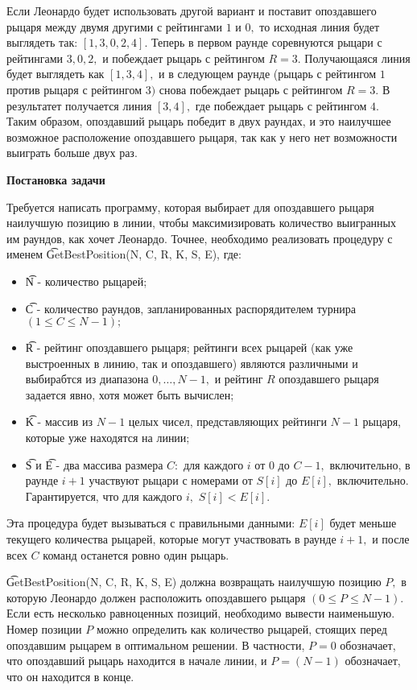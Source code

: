 Если Леонардо будет использовать другой вариант и поставит опоздавшего рыцаря между двумя другими с рейтингами $1$ и $0,$ то исходная линия будет выглядеть так: $[1, 3, 0, 2, 4].$ Теперь в первом раунде соревнуются рыцари с рейтингами $3, 0, 2,$ и побеждает рыцарь с рейтингом $R = 3.$ Получающаяся линия будет выглядеть как $[1, 3, 4],$ и в следующем раунде (рыцарь с рейтингом $1$ против рыцаря с рейтингом $3)$ снова побеждает рыцарь с рейтингом $R = 3.$ В результатет получается линия $[3, 4],$ где побеждает рыцарь с рейтингом $4.$ Таким образом, опоздавший рыцарь победит в двух раундах, и это наилучшее возможное расположение опоздавшего рыцаря, так как у него нет возможности выиграть больше двух раз.

\bf{Постановка задачи}

Требуется написать программу, которая выбирает для опоздавшего рыцаря наилучшую позицию в линии, чтобы максимизировать количество выигранных им раундов, как хочет Леонардо. Точнее, необходимо реализовать процедуру с именем \t{GetBestPosition(N, C, R, K, S, E)}, где:
\begin{itemize}
\item \t{N} - количество рыцарей;
\item \t{C} - количество раундов, запланированных распорядителем турнира $(1 \le C \le N - 1);$
\item \t{R} - рейтинг опоздавшего рыцаря; рейтинги всех рыцарей (как уже выстроенных в линию, так и опоздавшего) являются различными и выбирабтся из диапазона $0, \dots, N - 1,$ и рейтинг $R$ опоздавшего рыцаря задается явно, хотя может быть вычислен;
\item \t{K} - массив из $N - 1$ целых чисел, представляющих рейтинги $N - 1$ рыцаря, которые уже находятся на линии;
\item \t{S} и \t{E} -  два массива размера $C:$ для каждого $i$ от $0$ до $C - 1,$ включительно, в раунде $i + 1$ участвуют рыцари с номерами от $S[i]$ до $E[i],$ включительно. Гарантируется, что для каждого $i,$ $S[i] < E[i].$
\end{itemize}

Эта процедура будет вызываться с правильными данными: $E[i]$ будет меньше текущего количества рыцарей, которые могут участвовать в раунде $i+1,$ и после всех $C$ команд останется ровно один рыцарь.

\t{GetBestPosition(N, C, R, K, S, E)} должна возвращать наилучшую позицию $P,$ в которую Леонардо должен расположить опоздавшего рыцаря $(0 \le P \le N - 1).$ Если есть несколько равноценных позиций, необходимо вывести наименьшую. Номер позиции $P$ можно определить как количество рыцарей, стоящих перед опоздавшим рыцарем в оптимальном решении. В частности, $P = 0$ обозначает, что опоздавший рыцарь находится в начале линии, и $P = (N - 1)$ обозначает, что он находится в конце.

